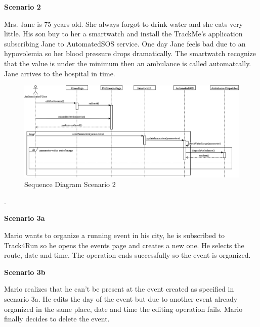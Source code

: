 \documentclass[../main.tex]{subfiles}
\begin{document}
		\begin{minipage}[t]{\textwidth}
			{\bf Scenario 2}
			\vspace{3mm}

			Mrs. Jane is 75 years old. She always forgot to drink water and she eats very little. His son buy to her a smartwatch and install the TrackMe's application subscribing Jane to AutomatedSOS service. One day Jane feels bad due to an hypovolemia so her blood pressure drops dramatically. The smartwatch recognize that the value is under the minimum then an ambulance is called automatcally. Jane arrives to the hospital in time.
			\vspace{5mm}
		\end{minipage}
		\begin{figure}[H]
			\centering
			\includegraphics[scale=.05]{images/sequenceDiagram2.png}
			\caption{Sequence Diagram Scenario 2 \label{fig:Sequence Diagram Scenario 2}}
		\end{figure}
		\begin{minipage}{\textwidth}
			. 
		\end{minipage}
		\begin{minipage}{\textwidth}
			{\bf Scenario 3a}
			\vspace{3mm}

			Mario wants to organize a running event in his city, he is subscribed to Track4Run so he opens the events page and creates a new one. He selects the route, date and time. The operation ends successfully so the event is organized.
			\vspace{5mm}
		\end{minipage}
		\begin{minipage}{\textwidth}
			{\bf Scenario 3b}
			\vspace{3mm}

			Mario realizes that he can't be present at the event created as specified in scenario 3a. He edits the day of the event but due to another event already organized in the same place, date and time the editing operation fails. Mario finally decides to delete the event.
			\vspace{5mm}
		\end{minipage}
\end{document}
